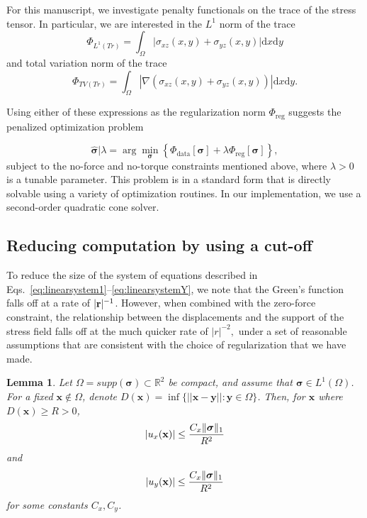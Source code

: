 \documentclass[aps,prl,reprint,twocolumn,groupedaddress,showpacs]{revtex4-1}
\newtheorem{lem}[thm]{Lemma}%
\DeclarePairedDelimiter{\norm}{\lVert}{\rVert}
\newcommand{\bsigma}{{\boldsymbol\sigma}}
\def\dd{\mbox{d}}
\def\r{{\bf r}}
\begin{document}
For this manuscript, we investigate penalty functionals on the trace
of the stress tensor. In particular, we are interested in the $L^1$
norm of the trace
\begin{equation}
\Phi_{L^1(Tr)} = \int_\Omega \vert \sigma_{xz}(x,y) + \sigma_{yz}(x,y)  \vert \dd x\dd y
\label{eq:PhiL1Tr}
\end{equation}
and total variation norm of the trace
%
\begin{equation}
\Phi_{TV(Tr)} =  \int_\Omega | \nabla(\sigma_{xz}(x,y) + \sigma_{yz}(x,y) ) | \dd x\dd y.
\label{eq:PhiTVTr}
\end{equation}

Using either of these expressions as the regularization norm
$\Phi_{\textrm{reg}}$ suggests the penalized optimization problem

\begin{equation}
\hat{\bsigma} \big\vert \lambda = \arg\min_{\bsigma} \left\{ \Phi_{\textrm{data}}[\bsigma] + 
\lambda\Phi_{\textrm{reg}}[\bsigma] \right\},\label{eq:objective}
\end{equation}
subject to the no-force and no-torque constraints mentioned above,
where $\lambda>0$ is a tunable parameter. This problem is in a
standard form that is directly solvable using a variety of
optimization routines.  In our implementation, we use a second-order
quadratic cone solver.

\subsection{Reducing computation by using a cut-off}
To reduce the size of the system of equations described in
Eqs.~\ref{eq:linearsystem1}--\ref{eq:linearsystemY}, we note that the
Green's function falls off at a rate of $|\r|^{-1}$. However, when
combined with the zero-force constraint, the relationship between the
displacements and the support of the stress field falls off at the
much quicker rate of $|r|^{-2},$ under a set of reasonable assumptions
that are consistent with the choice of regularization that we have
made.

\begin{lem} 
      \label{lem:multipole}
Let $\Omega = supp(\bsigma)\subset \mathbb{R}^2$ be compact, and
assume that $\bsigma\in L^1(\Omega)$. For a fixed
$\mathbf{x}\not\in\Omega$, denote $D(\mathbf{x}) = \inf\{ ||
\mathbf{x} -\mathbf{y}|| : \mathbf{y}\in\Omega \}$. Then, for
$\mathbf{x}$ where $D(\mathbf{x})\geq R>0$,
\begin{equation}
\vert u_x(\mathbf{x}) \vert \leq \frac{C_x\norm{\bsigma}_1}{R^2}
\end{equation}      
and
\begin{equation}
\vert u_y(\mathbf{x}) \vert \leq \frac{C_x\norm{\bsigma}_1}{R^2}
\end{equation}      
for some constants $C_x,C_y$.
\end{lem}
\end{document}
